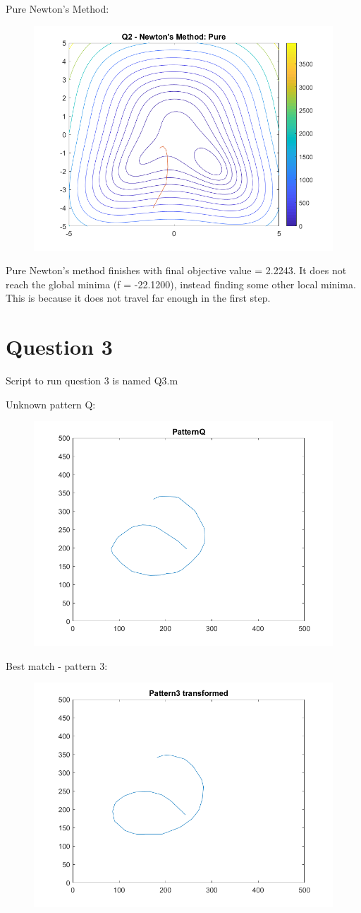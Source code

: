 \documentclass[10pt,a4paper]{article}
\begin{document}
\newpage
Pure Newton's Method:
\begin{figure} [H]
	\centering
	\includegraphics[width=0.7\linewidth]{q2np}
\end{figure}
Pure Newton's method finishes with final objective value = 2.2243. It does not reach the global minima (f = -22.1200), instead finding some other local minima. This is because it does not travel far enough in the first step.

\newpage
\section*{Question 3}
Script to run question 3 is named Q3.m

Unknown pattern Q:
\begin{figure} [H]
	\centering
	\includegraphics[width=0.75\linewidth]{q3pq}
\end{figure}

Best match -  pattern 3:
\begin{figure} [H]
	\centering
	\includegraphics[width=0.75\linewidth]{q3p3}
\end{figure}
\end{document}
